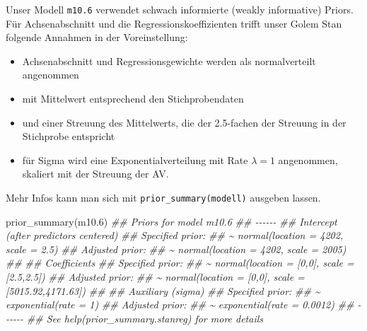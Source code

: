 \documentclass[
  ngerman,
  letterpaper,
  twoside,
  open=any]{scrbook}
\newenvironment{Shaded}{\begin{snugshade}}{\end{snugshade}}
\newcommand{\DocumentationTok}[1]{\textcolor[rgb]{0.37,0.37,0.37}{\textit{#1}}}
\newcommand{\FloatTok}[1]{\textcolor[rgb]{0.68,0.00,0.00}{#1}}
\newcommand{\FunctionTok}[1]{\textcolor[rgb]{0.28,0.35,0.67}{#1}}
\newcommand{\NormalTok}[1]{\textcolor[rgb]{0.00,0.23,0.31}{#1}}
\providecommand{\tightlist}{%
  \setlength{\itemsep}{0pt}\setlength{\parskip}{0pt}}\usepackage{longtable,booktabs,array}
\theoremstyle{definition}
\theoremstyle{plain}
\theoremstyle{definition}
\theoremstyle{definition}
\theoremstyle{definition}
\theoremstyle{definition}
\theoremstyle{remark}
\begin{document}
Unser Modell \texttt{m10.6} verwendet schwach informierte (weakly
informative) Priors. Für Achsenabschnitt und die
Regressionskoeffizienten trifft unser Golem Stan folgende Annahmen in
der Voreinstellung:

\begin{itemize}
\tightlist
\item
  Achsenabschnitt und Regressionsgewichte werden als normalverteilt
  angenommen
\item
  mit Mittelwert entsprechend den Stichprobendaten
\item
  und einer Streuung des Mittelwerts, die der 2.5-fachen der Streuung in
  der Stichprobe entspricht
\item
  für Sigma wird eine Exponentialverteilung mit Rate \(\lambda=1\)
  angenommen, skaliert mit der Streuung der AV.
\end{itemize}

Mehr Infos kann man sich mit \texttt{prior\_summary(modell)} ausgeben
lassen.

\begin{Shaded}
\begin{Highlighting}[]
\FunctionTok{prior\_summary}\NormalTok{(m10}\FloatTok{.6}\NormalTok{)}
\DocumentationTok{\#\# Priors for model \textquotesingle{}m10.6\textquotesingle{} }
\DocumentationTok{\#\# {-}{-}{-}{-}{-}{-}}
\DocumentationTok{\#\# Intercept (after predictors centered)}
\DocumentationTok{\#\#   Specified prior:}
\DocumentationTok{\#\#     \textasciitilde{} normal(location = 4202, scale = 2.5)}
\DocumentationTok{\#\#   Adjusted prior:}
\DocumentationTok{\#\#     \textasciitilde{} normal(location = 4202, scale = 2005)}
\DocumentationTok{\#\# }
\DocumentationTok{\#\# Coefficients}
\DocumentationTok{\#\#   Specified prior:}
\DocumentationTok{\#\#     \textasciitilde{} normal(location = [0,0], scale = [2.5,2.5])}
\DocumentationTok{\#\#   Adjusted prior:}
\DocumentationTok{\#\#     \textasciitilde{} normal(location = [0,0], scale = [5015.92,4171.63])}
\DocumentationTok{\#\# }
\DocumentationTok{\#\# Auxiliary (sigma)}
\DocumentationTok{\#\#   Specified prior:}
\DocumentationTok{\#\#     \textasciitilde{} exponential(rate = 1)}
\DocumentationTok{\#\#   Adjusted prior:}
\DocumentationTok{\#\#     \textasciitilde{} exponential(rate = 0.0012)}
\DocumentationTok{\#\# {-}{-}{-}{-}{-}{-}}
\DocumentationTok{\#\# See help(\textquotesingle{}prior\_summary.stanreg\textquotesingle{}) for more details}
\end{Highlighting}
\end{Shaded}
\end{document}
